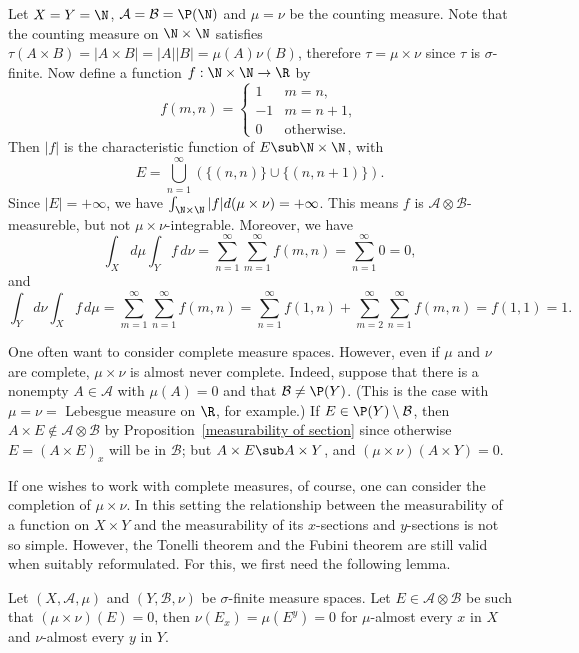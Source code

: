 \begin{example}
Let $X=Y=\N$, $\mathcal{A}=\mathcal{B}=\P(\N)$ and $\mu=\nu$ be the counting measure. Note that the counting measure on $\N\times\N$ satisfies $\tau(A\times B)=|A\times B|=|A||B|=\mu(A)\nu(B)$, therefore $\tau=\mu\times\nu$ since $\tau$ is $\sigma$-finite. Now define a function $f:\N\times\N\to\R$ by
\[f(m,n)=\begin{cases}
1&m=n,\\
-1&m=n+1,\\
0&\text{otherwise}.
\end{cases}\]
Then $|f|$ is the characteristic function of $E\sub\N\times \N$, with
\[E=\bigcup_{n=1}^{\infty}(\{(n,n)\}\cup\{(n,n+1)\}).\]
Since $|E|=+\infty$, we have $\int_{\N\times\N}|f|d(\mu\times\nu)=+\infty$. This means $f$ is $\mathcal{A}\otimes\mathcal{B}$-measureble, but not $\mu\times\nu$-integrable. Moreover, we have
\[\int_Xd\mu\int_Yf\,d\nu=\sum_{n=1}^{\infty}\sum_{m=1}^{\infty}f(m,n)=\sum_{n=1}^{\infty}0=0,\]
and
\[\int_Yd\nu\int_Xf\,d\mu=\sum_{m=1}^{\infty}\sum_{n=1}^{\infty}f(m,n)=\sum_{n=1}^{\infty}f(1,n)+\sum_{m=2}^{\infty}\sum_{n=1}^{\infty}f(m,n)=f(1,1)=1.\]
\end{example}
One often want to consider complete measure spaces. However, even if $\mu$ and $\nu$ are complete, $\mu\times\nu$ is almost never complete. Indeed, suppose that there is a nonempty $A\in\mathcal{A}$ with $\mu(A)=0$ and that $\mathcal{B}\neq\P(Y)$. (This is the case with $\mu=\nu=$ Lebesgue measure on $\R$, for example.) If $E\in\P(Y)\setminus\mathcal{B}$, then $A\times E\notin\mathcal{A}\otimes\mathcal{B}$ by Proposition~\ref{measurability of section} since otherwise $E=(A\times E)_x$ will be in $\mathcal{B}$; but $A\times E\sub A\times Y$, and $(\mu\times\nu)(A\times Y)=0$.\par
If one wishes to work with complete measures, of course, one can consider the completion of $\mu\times\nu$. In this setting the relationship between the measurability of a function on $X\times Y$ and the measurability of its $x$-sections and $y$-sections is not so simple. However, the Tonelli theorem and the Fubini theorem are still valid when suitably reformulated. For this, we first need the following lemma.
\begin{lemma}\label{product measure null set section}
Let $(X,\mathcal{A},\mu)$ and $(Y,\mathcal{B},\nu)$ be $\sigma$-finite measure spaces. Let $E\in\mathcal{A}\otimes\mathcal{B}$ be such that $(\mu\times\nu)(E)=0$, then $\nu(E_x)=\mu(E^y)=0$ for $\mu$-almost every $x$ in $X$ and $\nu$-almost every $y$ in $Y$.
\end{lemma}

